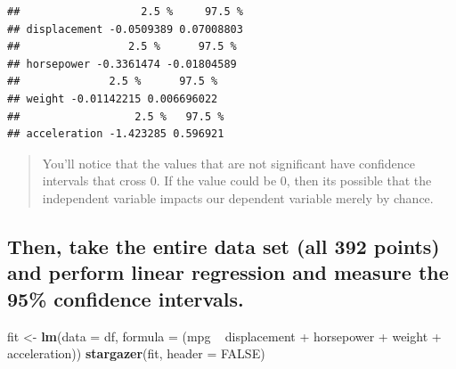 \documentclass[]{article}
\newenvironment{Shaded}{\begin{snugshade}}{\end{snugshade}}
\newcommand{\KeywordTok}[1]{\textcolor[rgb]{0.13,0.29,0.53}{\textbf{{#1}}}}
\newcommand{\DataTypeTok}[1]{\textcolor[rgb]{0.13,0.29,0.53}{{#1}}}
\newcommand{\StringTok}[1]{\textcolor[rgb]{0.31,0.60,0.02}{{#1}}}
\newcommand{\OtherTok}[1]{\textcolor[rgb]{0.56,0.35,0.01}{{#1}}}
\newcommand{\NormalTok}[1]{{#1}}
\begin{document}
\begin{verbatim}
##                   2.5 %     97.5 %
## displacement -0.0509389 0.07008803
##                 2.5 %      97.5 %
## horsepower -0.3361474 -0.01804589
##              2.5 %      97.5 %
## weight -0.01142215 0.006696022
##                  2.5 %   97.5 %
## acceleration -1.423285 0.596921
\end{verbatim}

\begin{quote}
You'll notice that the values that are not significant have confidence
intervals that cross 0. If the value could be 0, then its possible that
the independent variable impacts our dependent variable merely by
chance.
\end{quote}

\newpage

\subsection{Then, take the entire data set (all 392 points) and perform
linear regression and measure the 95\% confidence
intervals.}\label{then-take-the-entire-data-set-all-392-points-and-perform-linear-regression-and-measure-the-95-confidence-intervals.}

\begin{Shaded}
\begin{Highlighting}[]
\NormalTok{fit <-}\StringTok{ }\KeywordTok{lm}\NormalTok{(}\DataTypeTok{data =} \NormalTok{df, }\DataTypeTok{formula =} \NormalTok{(mpg ~}\StringTok{ }\NormalTok{displacement +}
\StringTok{                                  }\NormalTok{horsepower +}\StringTok{ }\NormalTok{weight +}\StringTok{ }\NormalTok{acceleration))}
\KeywordTok{stargazer}\NormalTok{(fit, }\DataTypeTok{header =} \OtherTok{FALSE}\NormalTok{)}
\end{Highlighting}
\end{Shaded}
\end{document}
